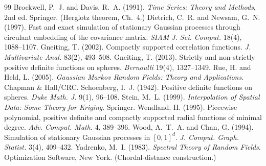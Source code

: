 \documentclass[11pt]{article}
\begin{document}
\begin{thebibliography}{99}
Brockwell, P.~J. and Davis, R.~A. (1991). \emph{Time Series: Theory and
Methods}, 2nd ed. Springer. (Herglotz theorem, Ch.~4.)
Dietrich, C.~R. and Newsam, G.~N. (1997). Fast and exact simulation of
stationary Gaussian processes through circulant embedding of the covariance
matrix. \emph{SIAM J. Sci. Comput.} 18(4), 1088--1107.
Gneiting, T. (2002). Compactly supported correlation functions.
\emph{J. Multivariate Anal.} 83(2), 493--508.
Gneiting, T. (2013). Strictly and non-strictly positive definite functions on
spheres. \emph{Bernoulli} 19(4), 1327--1349.
Rue, H. and Held, L. (2005). \emph{Gaussian Markov Random Fields: Theory and
Applications}. Chapman \& Hall/CRC.
Schoenberg, I.~J. (1942). Positive definite functions on spheres.
\emph{Duke Math. J.} 9(1), 96--108.
Stein, M.~L. (1999). \emph{Interpolation of Spatial Data: Some Theory for
Kriging}. Springer.
Wendland, H. (1995). Piecewise polynomial, positive definite and compactly
supported radial functions of minimal degree. \emph{Adv. Comput. Math.} 4,
389--396.
Wood, A.~T.~A. and Chan, G. (1994). Simulation of stationary Gaussian
processes in $[0,1]^d$. \emph{J. Comput. Graph. Statist.} 3(4), 409--432.
Yadrenko, M.~I. (1983). \emph{Spectral Theory of Random Fields}.
Optimization Software, New York. (Chordal-distance construction.)
\end{thebibliography}
\end{document}
